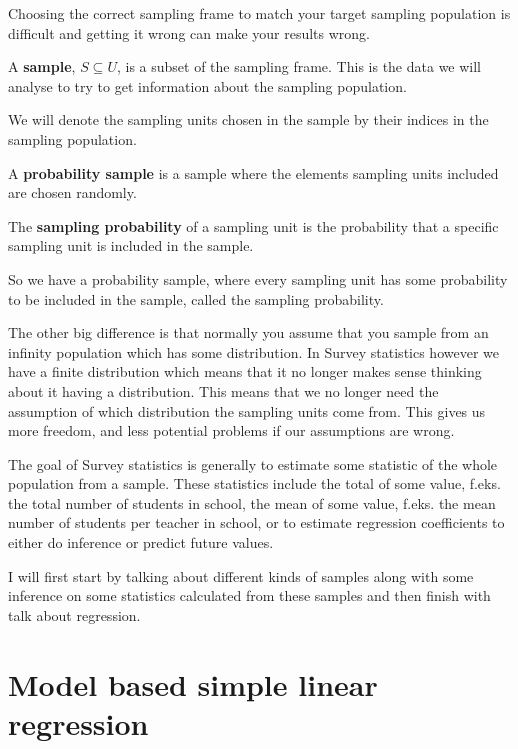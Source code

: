 \documentclass{article}
\begin{document}
Choosing the correct sampling frame to match your target sampling population is
difficult and getting it wrong can make your results wrong.


\begin{definition} \label{def:sample}
A \textbf{sample}, $S \subseteq U$, is a subset of the sampling frame. This is the data we will analyse to try to get information about the sampling population.
\end{definition}

We will denote the sampling units chosen in the sample by their indices in the
sampling population.

\begin{definition} \label{def:probSample}
A \textbf{probability sample} is a sample where the elements sampling units included are chosen randomly.
\end{definition}

\begin{definition} \label{def:sampProb}
The \textbf{sampling probability} of a sampling unit is the probability that a specific sampling unit is included in the sample.
\end{definition}

So we have a probability sample, where every sampling unit has some probability to be included in the sample, called the sampling probability.


The other big difference is that normally you assume that you sample from an
infinity population which has some distribution. In Survey statistics however we
have a finite distribution which means that it no longer makes sense thinking
about it having a distribution. This means that we no longer need the assumption
of which distribution the sampling units come from. This gives us more freedom,
and less potential problems if our assumptions are wrong.


The goal of Survey statistics is generally to estimate some statistic of the whole
population from a sample. These statistics include the total of some value,
f.eks. the total number of students in school, the mean of some value, f.eks.
the mean number of students per teacher in school, or to estimate regression
coefficients to either do inference or predict future values.

I will first start by talking about different kinds of samples along with some
inference on some statistics calculated from these samples and then finish with
talk about regression.

\section{Model based simple linear regression} \label{sec:modLinReg}
\end{document}
